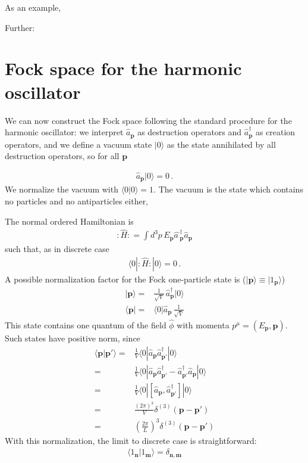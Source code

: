 As an example,  

Further: %

\section{Fock space for the harmonic oscillator}
We can now construct the Fock space following the standard procedure
for the harmonic oscillator: we interpret $\widehat{a}_\mathbf{p}$ as destruction operators and $\widehat{a}_\mathbf{p}^\dagger$
as creation operators, and we define a vacuum state $|0\rangle$ as the state
annihilated by all destruction operators, so for all $\mathbf{p}$
\begin{frame}
\begin{align}
  \widehat{a}_\mathbf{p}|0\rangle=0\,.
\end{align}
We normalize the vacuum with $\langle0|0\rangle=1$. The vacuum is the state which contains no particles and no antiparticles either,

The normal ordered Hamiltonian is
\begin{align}
   \colon\!\widehat{H}\colon=\int d^3p\,E_{\mathbf{p}}\widehat{a\,}_{\mathbf{p}}^\dagger\widehat{a}_{\mathbf{p}}
\end{align}
such that, as in discrete case
\begin{align}
  \langle0|\colon\!\widehat{H}\colon|0\rangle=0\,.
\end{align}
A possible normalization factor for the Fock one-particle state is ($|\mathbf{p}\rangle\equiv|1_{\mathbf{p}}\rangle$)
\begin{align}
\label{eq:38f}
  |\mathbf{p}\rangle=&\frac{1}{\sqrt{V}}\, \widehat{a}^\dagger_{\mathbf{p}}|0\rangle\nonumber\\
  \langle \mathbf{p}|=&\langle0|\widehat{a}_{\mathbf{p}}\, \frac{1}{\sqrt{V}}
\end{align}
This state contains one quantum of the field $\widehat{\phi}$ with momenta $p^\mu=(E_{\mathbf{p}},\mathbf{p})$. Such states have positive norm, since
\begin{align}
    \langle \mathbf{p}|\mathbf{p}'\rangle=&\frac{1}{V} \langle0|\widehat{a}_{\mathbf{p}}\widehat{a}^\dagger_{\mathbf{p}'}|0\rangle\nonumber\\
=&\frac{1}{V} \langle0|\widehat{a}_{\mathbf{p}}\widehat{a}^\dagger_{\mathbf{p}'}-\widehat{a}^\dagger_{\mathbf{p}'}\widehat{a}_{\mathbf{p}}|0\rangle\nonumber\\
=&\frac{1}{V} \langle0|[\widehat{a}_{\mathbf{p}},\widehat{a}^\dagger_{\mathbf{p}'}]|0\rangle\nonumber\\
=&\frac{(2\pi)^3}{V} \delta^{(3)}(\mathbf{p}-\mathbf{p}')\nonumber\\=&\left(\frac{2\pi}{L}\right)^3 \delta^{(3)}(\mathbf{p}-\mathbf{p}')
\end{align}
With this normalization, the limit to discrete case is straightforward:
\begin{align}
  \langle1_{\mathbf{n}}|1_{\mathbf{m}}\rangle=\delta_{\mathbf{n},\mathbf{m}}
\end{align}



\end{frame}
